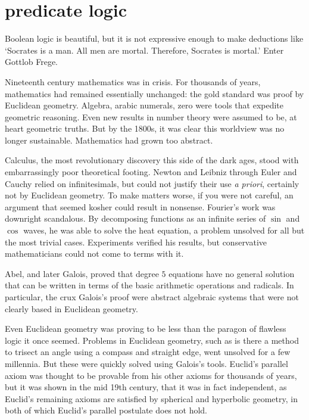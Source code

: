 \documentclass{scrbook}
\begin{document}
\chapter[Predicate Logic]{predicate logic}
Boolean logic is beautiful, but it is not expressive enough to make deductions like `Socrates is a man. All men are mortal. Therefore, Socrates is mortal.' Enter Gottlob Frege. 

Nineteenth century mathematics was in crisis. For thousands of years, mathematics had remained essentially unchanged: the gold standard was proof by Euclidean geometry. Algebra, arabic numerals, zero were tools that expedite geometric reasoning. Even new results in number theory were assumed to be, at heart geometric truths. But by the 1800s, it was clear this worldview was no longer sustainable. Mathematics had grown too abstract.

Calculus, the most revolutionary discovery this side of the dark ages, stood with embarrassingly poor theoretical footing. Newton and Leibniz through Euler and Cauchy relied on infinitesimals, but could not justify their use \emph{a priori}, certainly not by Euclidean geometry. To make matters worse, if you were not careful, an argument that seemed kosher could result in nonsense. 
Fourier's work was downright scandalous. By decomposing functions as an infinite series of $\sin$ and $\cos$ waves, he was able to solve the heat equation, a problem unsolved for all but the most trivial cases. Experiments verified his results, but conservative mathematicians could not come to terms with it. 

Abel, and later Galois, proved that degree $5$ equations have no general solution that can be written in terms of the basic arithmetic operations and radicals. In particular, the crux Galois's proof were abstract algebraic systems that were not clearly based in Euclidean geometry. 

Even Euclidean geometry was proving to be less than the paragon of flawless logic it once seemed. Problems in Euclidean geometry, such as is there a method to trisect an angle using a compass and straight edge, went unsolved for a few millennia. But these were quickly solved using Galois's tools. Euclid's parallel axiom was thought to be provable from his other axioms for thousands of years, but it was shown in the mid 19th century, that it was in fact independent, as Euclid's remaining axioms are satisfied by spherical and hyperbolic geometry, in both of which Euclid's parallel postulate does not hold. 
\end{document}
